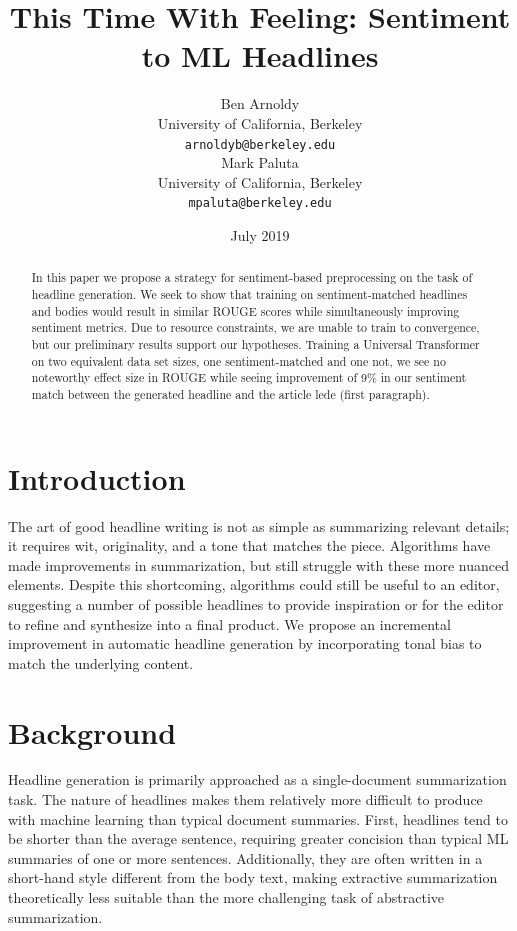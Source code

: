 \documentclass[11pt]{article}
\title{This Time With Feeling: Sentiment to ML Headlines}
\author{Ben Arnoldy \\
  University of California, Berkeley \\
  {\tt arnoldyb@berkeley.edu} \\\And
  Mark Paluta \\
  University of California, Berkeley \\
  {\tt mpaluta@berkeley.edu} \\}
\date{July 2019}
\begin{document}
\maketitle

\begin{abstract}

In this paper we propose a strategy for sentiment-based preprocessing on the task of headline generation. We seek to show that training on sentiment-matched headlines and bodies would result in similar ROUGE scores while simultaneously improving sentiment metrics. Due to resource constraints, we are unable to train to convergence, but our preliminary results support our hypotheses. Training a Universal Transformer on two equivalent data set sizes, one sentiment-matched and one not, we see no noteworthy effect size in ROUGE while seeing improvement of 9\% in our sentiment match between the generated headline and the article lede (first paragraph).
    
\end{abstract}

\section{Introduction}
The art of good headline writing is not as simple as summarizing relevant details; it requires wit, originality, and a tone that matches the piece. Algorithms have made improvements in summarization, but still struggle with these more nuanced elements. Despite this shortcoming, algorithms could still be useful to an editor, suggesting a number of possible headlines to provide inspiration or for the editor to refine and synthesize into a final product. We propose an incremental improvement in automatic headline generation by incorporating tonal bias to match the underlying content.

\section{Background}
Headline generation is primarily approached as a single-document summarization task. The nature of headlines makes them relatively more difficult to produce with machine learning than typical document summaries. First, headlines tend to be shorter than the average sentence, requiring greater concision than typical ML summaries of one or more sentences. Additionally, they are often written in a short-hand style different from the body text, making extractive summarization theoretically less suitable than the more challenging task of abstractive summarization. 
\end{document}
